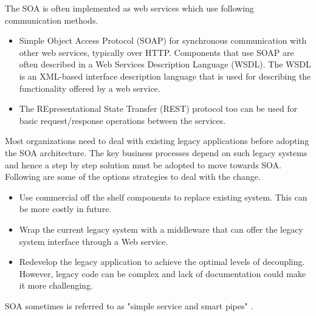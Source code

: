 \documentclass[conference]{IEEEtran}
\begin{document}
\par The SOA is often implemented as web services which use following communication methods.
\begin{itemize}
\item Simple Object Access Protocol (SOAP) for synchronous communication with other web services, typically over HTTP. Components that use SOAP are often described in a Web Services Description Language (WSDL). The WSDL is an XML-based interface description language that is used for describing the functionality offered by a web service. 
\item The REpresentational State Transfer (REST) protocol too can be used for basic request/response operations between the services.
\end{itemize}

Most organizations need to deal with existing legacy applications before adopting the SOA architecture. The key business processes depend on such legacy systems and hence a step by step solution must be adopted to move towards SOA. Following are some of the options strategies to deal with the change.
\begin{itemize}
\item Use commercial off the shelf components to replace existing system. This can be more costly in future.
\item Wrap the current legacy system with a middleware that can offer the legacy system interface through a Web service.
\item Redevelop the legacy application to achieve the optimal levels of decoupling. However, legacy code can be complex and lack of documentation could make it more challenging.
\end{itemize}
SOA sometimes is referred to as "simple service and smart pipes" \cite{comparison}.
\end{document}

